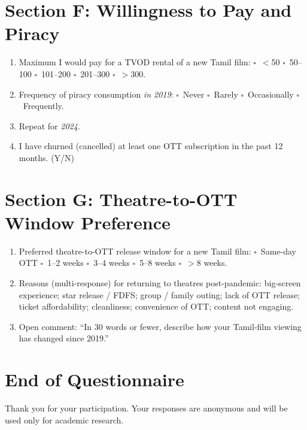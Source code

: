 \section*{Section F: Willingness to Pay and Piracy}
\begin{enumerate}[resume,itemsep=2pt]
  \item Maximum I would pay for a TVOD rental of a new Tamil film:
        $\square$~$<$50 \quad $\square$~50--100 \quad $\square$~101--200
        \quad $\square$~201--300 \quad $\square$~$>$300.
  \item Frequency of piracy consumption \emph{in 2019}: $\square$~Never
        \quad $\square$~Rarely \quad $\square$~Occasionally \quad
        $\square$~Frequently.
  \item Repeat for \emph{2024}.
  \item I have churned (cancelled) at least one OTT subscription in
        the past 12 months. (Y/N)
\end{enumerate}

\section*{Section G: Theatre-to-OTT Window Preference}
\begin{enumerate}[resume,itemsep=2pt]
  \item Preferred theatre-to-OTT release window for a new Tamil
        film: $\square$~Same-day OTT \quad $\square$~1--2 weeks \quad
        $\square$~3--4 weeks \quad $\square$~5--8 weeks \quad
        $\square$~$>$8 weeks.
  \item Reasons (multi-response) for returning to theatres
        post-pandemic: big-screen experience; star release / FDFS;
        group / family outing; lack of OTT release; ticket
        affordability; cleanliness; convenience of OTT;
        content not engaging.
  \item Open comment: ``In 30 words or fewer, describe how your
        Tamil-film viewing has changed since 2019.''
\end{enumerate}

\section*{End of Questionnaire}
\noindent
Thank you for your participation.  Your responses are anonymous
and will be used only for academic research.
